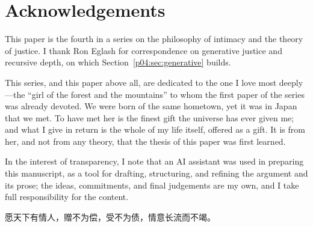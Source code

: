 \documentclass[11pt,a4paper]{article}
\newcommand{\zh}[1]{{\cjkfont #1}}
\begin{document}
\section*{Acknowledgements}
This paper is the fourth in a series on the philosophy of intimacy and the
theory of justice. I thank Ron Eglash for correspondence on generative
justice and recursive depth, on which Section~\ref{p04:sec:generative} builds.

This series, and this paper above all, are dedicated to the one I love most
deeply---the ``girl of the forest and the mountains'' to whom the first paper of the series was already
devoted. We were born of the same hometown, yet it was in Japan that we met.
To have met her is the finest gift the universe has ever given me; and what I
give in return is the whole of my life itself, offered as a gift. It is from
her, and not from any theory, that the thesis of this paper was first
learned.

In the interest of transparency, I note that an AI assistant was used in
preparing this manuscript, as a tool for drafting, structuring, and refining
the argument and its prose; the ideas, commitments, and final judgements are
my own, and I take full responsibility for the content.

\begin{center}
\zh{愿天下有情人，赠不为偿，受不为债，情意长流而不竭。}
\end{center}

\printbibliography[heading=bibintoc]
\end{document}
